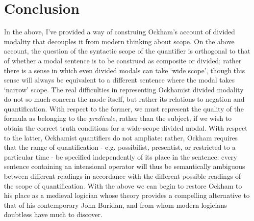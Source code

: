 \documentclass[a4paper]{article}
\begin{document}
\section{Conclusion}
In the above, I've provided a way of construing Ockham's account of divided modality that decouples it from modern thinking about scope. On the above account, the question of the syntactic scope of the quantifier is orthogonal to that of whether a modal sentence is to be construed as composite or divided; rather there is a sense in which even divided modals can take `wide scope', though this sense will always be equivalent to a different sentence where the modal takes `narrow' scope. The real difficulties in representing Ockhamist divided modality do not so much concern the mode itself, but rather its relations to negation and quantification. With respect to the former, we must represent the quality of the formula as belonging to the \textit{predicate}, rather than the subject, if we wish to obtain the correct truth conditions for a wide-scope divided modal. With respect to the latter, Ockhamist quantifiers do not ampliate: rather, Ockham requires that the range of quantification - e.g. possibilist, presentist, or restricted to a particular time - be specified independently of its place in the sentence: every sentence containing an intensional operator will thus be semantically ambiguous between different readings in accordance with the different possible readings of the scope of quantification. With the above we can begin to restore Ockham to his place as a medieval logician whose theory provides a compelling alternative to that of his contemporary John Buridan, and from whom modern logicians doubtless have much to discover. 

\printbibliography 
\end{document}
